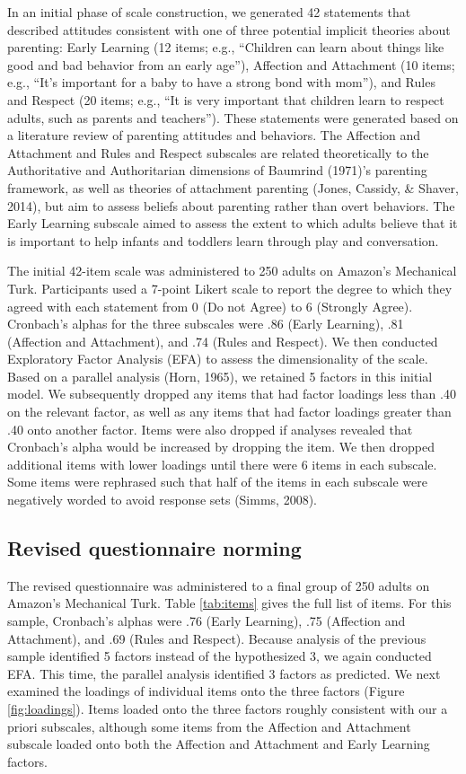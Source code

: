 \documentclass[10pt, letterpaper]{article}
\begin{document}
In an initial phase of scale construction, we generated 42 statements
that described attitudes consistent with one of three potential implicit
theories about parenting: Early Learning (12 items; e.g., ``Children can
learn about things like good and bad behavior from an early age''),
Affection and Attachment (10 items; e.g., ``It's important for a baby to
have a strong bond with mom''), and Rules and Respect (20 items; e.g.,
``It is very important that children learn to respect adults, such as
parents and teachers''). These statements were generated based on a
literature review of parenting attitudes and behaviors. The Affection
and Attachment and Rules and Respect subscales are related theoretically
to the Authoritative and Authoritarian dimensions of Baumrind (1971)'s
parenting framework, as well as theories of attachment parenting (Jones,
Cassidy, \& Shaver, 2014), but aim to assess beliefs about parenting
rather than overt behaviors. The Early Learning subscale aimed to assess
the extent to which adults believe that it is important to help infants
and toddlers learn through play and conversation.

The initial 42-item scale was administered to 250 adults on Amazon's
Mechanical Turk. Participants used a 7-point Likert scale to report the
degree to which they agreed with each statement from 0 (Do not Agree) to
6 (Strongly Agree). Cronbach's alphas for the three subscales were .86
(Early Learning), .81 (Affection and Attachment), and .74 (Rules and
Respect). We then conducted Exploratory Factor Analysis (EFA) to assess
the dimensionality of the scale. Based on a parallel analysis (Horn,
1965), we retained 5 factors in this initial model. We subsequently
dropped any items that had factor loadings less than .40 on the relevant
factor, as well as any items that had factor loadings greater than .40
onto another factor. Items were also dropped if analyses revealed that
Cronbach's alpha would be increased by dropping the item. We then
dropped additional items with lower loadings until there were 6 items in
each subscale. Some items were rephrased such that half of the items in
each subscale were negatively worded to avoid response sets (Simms,
2008).

\subsection{Revised questionnaire
norming}\label{revised-questionnaire-norming}

The revised questionnaire was administered to a final group of 250
adults on Amazon's Mechanical Turk. Table \ref{tab:items} gives the full
list of items. For this sample, Cronbach's alphas were .76 (Early
Learning), .75 (Affection and Attachment), and .69 (Rules and Respect).
Because analysis of the previous sample identified 5 factors instead of
the hypothesized 3, we again conducted EFA. This time, the parallel
analysis identified 3 factors as predicted. We next examined the
loadings of individual items onto the three factors (Figure
\ref{fig:loadings}). Items loaded onto the three factors roughly
consistent with our a priori subscales, although some items from the
Affection and Attachment subscale loaded onto both the Affection and
Attachment and Early Learning factors.
\end{document}
